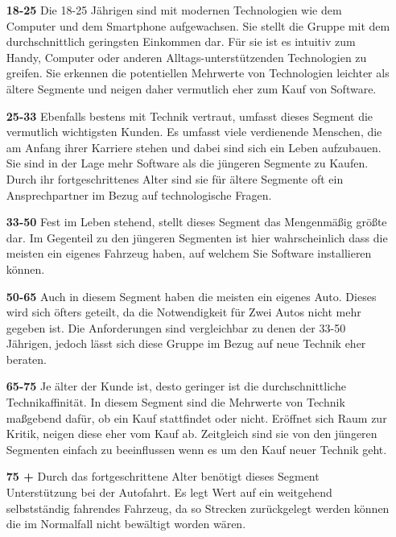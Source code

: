 \begin{itemize}
	\item[\textbf{18-25}] 
	Die 18-25 Jährigen sind mit modernen Technologien wie dem Computer und dem Smartphone aufgewachsen. Sie stellt die Gruppe mit dem durchschnittlich geringsten Einkommen dar. Für sie ist es intuitiv zum Handy, Computer oder anderen Alltags-unterstützenden Technologien zu greifen. Sie erkennen die potentiellen Mehrwerte von Technologien leichter als ältere Segmente und neigen daher vermutlich eher zum Kauf von Software. 
	
	\item[\textbf{25-33}]
	Ebenfalls bestens mit Technik vertraut, umfasst dieses Segment die vermutlich wichtigsten Kunden. Es umfasst viele verdienende Menschen, die am Anfang ihrer Karriere stehen und dabei sind sich ein Leben aufzubauen. Sie sind in der Lage mehr Software als die jüngeren Segmente zu Kaufen. Durch ihr fortgeschrittenes Alter sind sie für ältere Segmente oft ein Ansprechpartner im Bezug auf technologische Fragen.\cite{b102}
		
	\item[\textbf{33-50}]
	Fest im Leben stehend, stellt dieses Segment das Mengenmäßig größte dar.\cite[S. 4]{fahrerAlter} Im Gegenteil zu den jüngeren Segmenten ist hier wahrscheinlich dass die meisten ein eigenes Fahrzeug haben, auf welchem Sie Software installieren können. 
	
	\item[\textbf{50-65}]
	Auch in diesem Segment haben die meisten ein eigenes Auto.\cite[ebenda]{fahrerAlter} Dieses wird sich öfters geteilt, da die Notwendigkeit für Zwei Autos nicht mehr gegeben ist. Die Anforderungen sind vergleichbar zu denen der 33-50 Jährigen, jedoch lässt sich diese Gruppe im Bezug auf neue Technik eher beraten.
	
	\item[\textbf{65-75}]
	Je älter der Kunde ist, desto geringer ist die durchschnittliche Technikaffinität. In diesem Segment sind die Mehrwerte von Technik maßgebend dafür, ob ein Kauf stattfindet oder nicht. Eröffnet sich Raum zur Kritik, neigen diese eher vom Kauf ab.\cite{b101} Zeitgleich sind sie von den jüngeren Segmenten einfach zu beeinflussen wenn es um den Kauf neuer Technik geht.
	
	\item[\textbf{75 +}]
	Durch das fortgeschrittene Alter benötigt dieses Segment Unterstützung bei der Autofahrt. Es legt Wert auf ein weitgehend selbstständig fahrendes Fahrzeug, da so Strecken zurückgelegt werden können die im Normalfall nicht bewältigt worden wären. 
\end{itemize}

